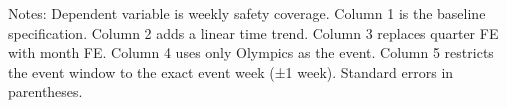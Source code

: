 \begin{table}[htbp]
   \par \raggedright 
   Notes: Dependent variable is weekly safety coverage. Column 1 is the baseline specification. Column 2 adds a linear time trend. Column 3 replaces quarter FE with month FE. Column 4 uses only Olympics as the event. Column 5 restricts the event window to the exact event week (±1 week). Standard errors in parentheses.
\end{table}


